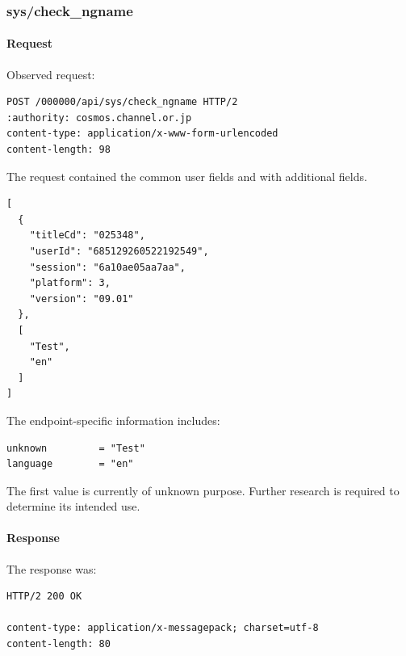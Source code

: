 \subsubsection{sys/check\_ngname}
\label{subsec:api_sys_check_ngname}

\paragraph{Request}

Observed request:

\begin{lstlisting}
POST /000000/api/sys/check_ngname HTTP/2
:authority: cosmos.channel.or.jp
content-type: application/x-www-form-urlencoded
content-length: 98
\end{lstlisting}

The request contained the common user fields and with additional fields.

\begin{lstlisting}
[
  {
    "titleCd": "025348",
    "userId": "685129260522192549",
    "session": "6a10ae05aa7aa",
    "platform": 3,
    "version": "09.01"
  },
  [
    "Test",
    "en"
  ]
]
\end{lstlisting}

The endpoint-specific information includes:

\begin{lstlisting}
unknown         = "Test"
language        = "en"
\end{lstlisting}

\begin{tcolorbox}[colback=yellow!10,colframe=orange!80!black,title=Warning]
The first value is currently of unknown purpose.
Further research is required to determine its intended use.
\end{tcolorbox}

\newpage

\paragraph{Response}

The response was:

\begin{lstlisting}
HTTP/2 200 OK

content-type: application/x-messagepack; charset=utf-8
content-length: 80
\end{lstlisting}

